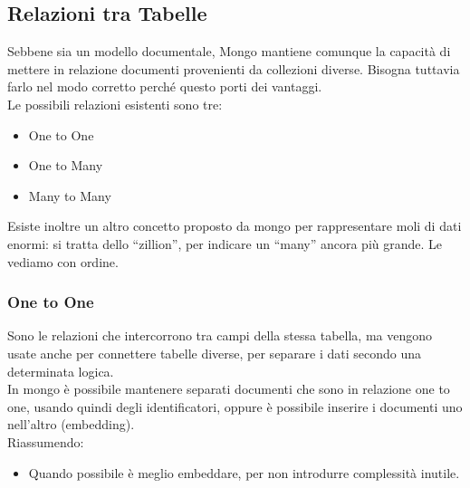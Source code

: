 \subsection{Relazioni tra Tabelle}
Sebbene sia un modello documentale, Mongo mantiene comunque la capacità di mettere in relazione documenti provenienti da collezioni diverse. Bisogna tuttavia farlo nel modo corretto perché questo porti dei vantaggi.\\

\noindent Le possibili relazioni esistenti sono tre:
\begin{itemize}
    \item One to One
    \item One to Many
    \item Many to Many
\end{itemize}
Esiste inoltre un altro concetto proposto da mongo per rappresentare moli di dati enormi: si tratta dello ``zillion'', per indicare un ``many'' ancora più grande. Le vediamo con ordine.

\subsubsection{One to One}
Sono le relazioni che intercorrono tra campi della stessa tabella, ma vengono usate anche per connettere tabelle diverse, per separare i dati secondo una determinata logica.\\
In mongo è possibile mantenere separati documenti che sono in relazione one to one, usando quindi degli identificatori, oppure è possibile inserire i documenti uno nell'altro (embedding).\\
Riassumendo:
\begin{itemize}
    \item Quando possibile è meglio embeddare, per non introdurre complessità inutile.
\end{itemize}

